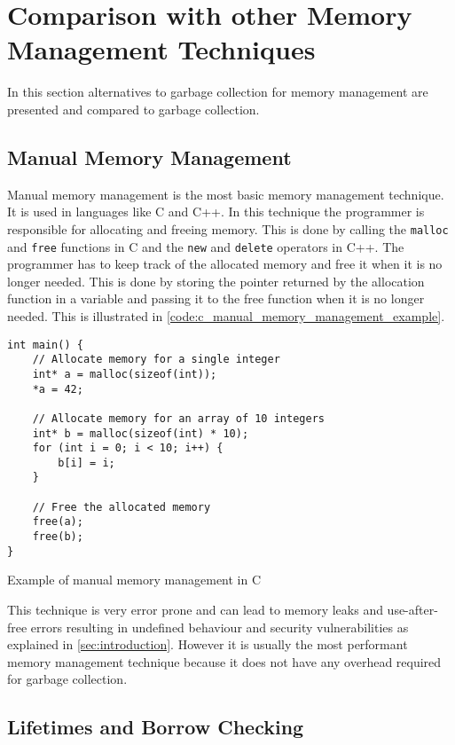 \chapter{Comparison with other Memory Management Techniques}

In this section alternatives to garbage collection for memory management
are presented and compared to garbage collection.

\section{Manual Memory Management}

Manual memory management is the most basic memory management technique.
It is used in languages like C and C++.
In this technique the programmer is responsible for allocating and freeing memory.
This is done by calling the \texttt{malloc} and \texttt{free} functions in C and the \texttt{new} and \texttt{delete} operators in C++.
The programmer has to keep track of the allocated memory and free it when it is no longer needed.
This is done by storing the pointer returned by the allocation function in a variable and passing it to the free function when it is no longer needed.
This is illustrated in \autoref{code:c_manual_memory_management_example}.

\begin{listing}[H] 
    \begin{verbatim}
int main() {
    // Allocate memory for a single integer
    int* a = malloc(sizeof(int));
    *a = 42;

    // Allocate memory for an array of 10 integers
    int* b = malloc(sizeof(int) * 10);
    for (int i = 0; i < 10; i++) {
        b[i] = i;
    }

    // Free the allocated memory
    free(a);
    free(b);
}
    \end{verbatim}
    \caption{Example of manual memory management in C}
    \label{code:c_manual_memory_management_example}
\end{listing}

This technique is very error prone and can lead to memory leaks and use-after-free errors
resulting in undefined behaviour and security vulnerabilities as explained in \autoref{sec:introduction}.
However it is usually the most performant memory management technique because it does not have any overhead
required for garbage collection.


\section{Lifetimes and Borrow Checking}


